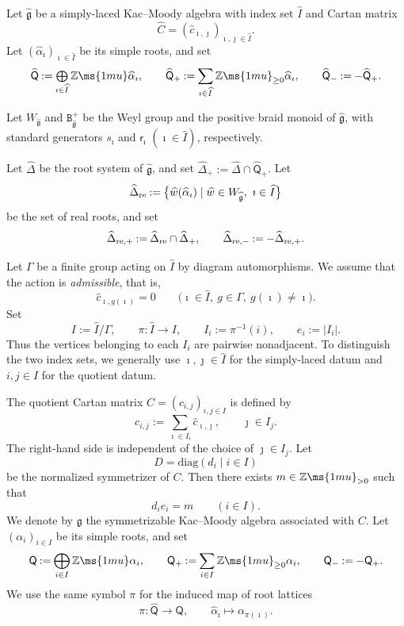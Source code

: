 \documentclass[12pt, leqno]{amsart}
\numberwithin{equation}{section}
\theoremstyle{plain}
\theoremstyle{definition}
\newcommand{\seteq}{\mathbin{:=}}
\newcommand{\soplus}{\mathop{\mbox{\normalsize$\bigoplus$}}\limits}
\newcommand{\g}{\mathfrak{g}}
\newcommand{\Z}{\mathbb{Z}\ms{1mu}}
\newcommand{\re}{{\rm re}}
\newcommand{\im}{\imath}
\newcommand{\jm}{\jmath}
\newcommand{\hC}{\widehat{C}}
\newcommand{\hI}{\widehat{I}}
\newcommand{\hc}{\widehat{c}}
\newcommand{\hg}{{\widehat{\g}}}
\newcommand{\hw}{\widehat{w}}
\newcommand{\sfQ}{\mathsf{Q}}
\newcommand{\sfr}{\mathsf{r}}
\newcommand{\hsfQ}{\widehat{\sfQ}}
\newcommand{\ttB}{\mathtt{B}}
\newcommand{\diag}{\mathrm{diag}}
\begin{document}
Let \(\hg\) be a simply-laced Kac--Moody algebra with index set
\(\hI\) and Cartan matrix
\[
\hC=(\hc_{\im,\jm})_{\im,\jm\in\hI}.
\]
Let \((\widehat\alpha_\im)_{\im\in\hI}\) be its simple roots, and set
\[
\hsfQ\seteq\soplus_{\im\in\hI}\Z\widehat\alpha_\im,
\qquad
\hsfQ_+\seteq \sum_{\im\in\hI}\Z_{\geq0}\widehat\alpha_\im,
\qquad
\hsfQ_-\seteq-\hsfQ_+.
\]

Let \(W_\hg\) and \(\ttB_\hg^+\) be the Weyl group and the positive
braid monoid of \(\hg\), with standard generators \(s_\im\) and
\(\sfr_\im\) $(\im \in \hI)$, respectively.

Let \(\widehat\Delta\) be the root system of \(\hg\), and set
\(\widehat\Delta_+\seteq\widehat\Delta\cap\hsfQ_+\). Let 
\[
\widehat\Delta_{\re} \seteq \bigl\{ \hw(\widehat\alpha_\im) \mid \hw\in W_\hg,\ \im\in\hI \bigr\}
\]
be the set of real roots, and set
\[
\widehat\Delta_{\re,+} \seteq \widehat\Delta_{\re}\cap\widehat\Delta_+, \qquad \widehat\Delta_{\re,-} \seteq -\widehat\Delta_{\re,+}.
\]


Let \(\Gamma\) be a finite group acting on \(\hI\) by diagram
automorphisms.  We assume that the action is \emph{admissible}, that
is,
\[
\hc_{\im,g(\im)}=0
\qquad
\bigl(\im\in\hI,\ g\in \Gamma,\ g(\im)\ne\im\bigr).
\]
Set
\[
I\seteq\hI/\Gamma, \qquad \pi:\hI\longrightarrow I, \qquad I_i\seteq\pi^{-1}(i), \qquad e_i\seteq|I_i|.
\]
Thus the vertices belonging to each \(I_i\) are pairwise
nonadjacent. To distinguish the two index sets, we generally use
\(\im,\jm\in\hI\) for the simply-laced datum and \(i,j\in I\) for
the quotient datum.

\smallskip

The quotient Cartan matrix \(C=(c_{i,j})_{i,j\in I}\) is defined by
\[
c_{i,j} \seteq \sum_{\im\in I_i}\hc_{\im,\jm}, \qquad \jm\in I_j.
\]
The right-hand side is independent of the choice of
\(\jm\in I_j\).  Let
\[
D=\diag(d_i\mid i\in I)
\]
be the normalized symmetrizer of \(C\).  Then there exists
\(m\in\Z_{>0}\) such that 
\begin{equation}\label{eq: symmetrizer and fiber cardinality}
d_ie_i=m \qquad(i\in I).
\end{equation}
We denote by \(\g\) the symmetrizable Kac--Moody algebra associated
with \(C\).
Let \((\alpha_i)_{i\in I}\) be its simple roots, and set
\[
\sfQ\seteq\bigoplus_{i\in I}\Z\alpha_i, \qquad
\sfQ_+\seteq\sum_{i\in I}\Z_{\geq0}\alpha_i, \qquad
\sfQ_-\seteq-\sfQ_+.
\]
We use the same symbol \(\pi\) for the induced map of root lattices
\[
\pi:\hsfQ\longrightarrow\sfQ, \qquad
\widehat\alpha_\im\longmapsto\alpha_{\pi(\im)}.
\]
\end{document}
